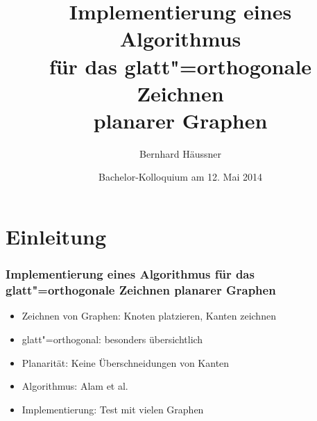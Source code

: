 \documentclass{beamer}
\begin{document}


\subject{Bachelorarbeit}
\title{Implementierung eines Algorithmus\\ für das glatt"=orthogonale Zeichnen \\ planarer Graphen} %
\author{Bernhard Häussner} %
\date{Bachelor-Kolloquium am 12. Mai 2014} %
\maketitle


\section{Einleitung}

\begin{frame}
  \frametitle{Implementierung eines Algorithmus für das glatt"=orthogonale Zeichnen planarer Graphen}
  \begin{itemize}[<+->]
    \item Zeichnen von Graphen: Knoten platzieren, Kanten zeichnen
    \item glatt"=orthogonal: besonders übersichtlich
    \item Planarität: Keine Überschneidungen von Kanten
    \item Algorithmus: Alam et al.~\cite{smooth-13}
    \item Implementierung: Test mit vielen Graphen
  \end{itemize}
\end{frame}
\end{document}
